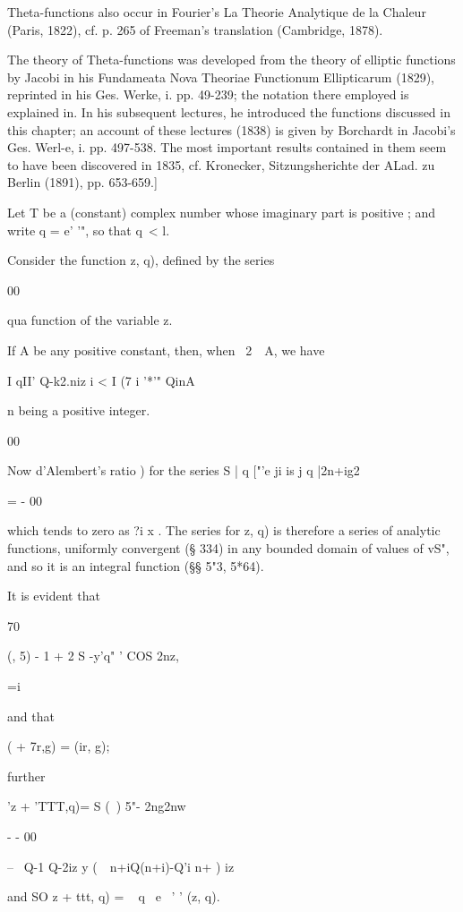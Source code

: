 %
%

Theta-functions also occur in Fourier's La Theorie Analytique de la
Chaleur (Paris, 1822), cf. p. 265 of Freeman's translation (Cambridge,
1878).

The theory of Theta-functions was developed from the theory of
elliptic functions by Jacobi in his Fundameata Nova Theoriae
Functionum Ellipticarum (1829), reprinted in his Ges. Werke, i. pp.
49-239; the notation there employed is explained in. In his
subsequent lectures, he introduced the functions discussed in this
chapter; an account of these lectures (1838) is given by Borchardt in
Jacobi's Ges. Werl-e, i. pp. 497-538. The most important results
contained in them seem to have been discovered in 1835, cf. Kronecker,
Sitzungsherichte der ALad. zu Berlin (1891), pp. 653-659.]

Let T be a (constant) complex number whose imaginary part is positive
; and write q = e' '", so that q\ < l.

Consider the function z, q), defined by the series

00

qua function of the variable z.

If A be any positive constant, then, when \ 2\ \ A, we have

I qII' Q-k2.niz i < I (7 i '*'" QinA

n being a positive integer.

00

Now d'Alembert's ratio ) for the series S | q ["'e ji is j q
|2n+ig2

  = - 00

which tends to zero as ?i x . The series for z, q) is therefore a
series of analytic functions, uniformly convergent (§ 334) in any
bounded domain of values of vS", and so it is an integral function (§§
5"3, 5*64).

It is evident that

 70

  (, 5) - 1 + 2 S -y'q" ' COS 2nz,

 =i

and that

 ( + 7r,g) = (ir, g);

further

'z + 'TTT,q)= S (\ ) 5"- 2ng2nw

 - - 00

-- \ Q-1 Q-2iz y (\ \ n+iQ(n+i)-Q'i n+ ) iz

and SO z + ttt, q) = ~ q~ e~ ' ' (z, q).

